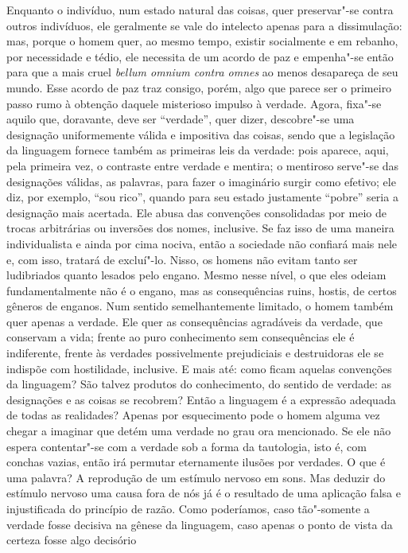 Enquanto o indivíduo, num estado natural das coisas, quer preservar"-se
contra outros indivíduos, ele geralmente se vale do intelecto apenas
para a dissimulação: mas, porque o homem quer, ao mesmo tempo, existir
socialmente e em rebanho, por necessidade e tédio, ele necessita de um
acordo de paz e empenha"-se então para que a mais cruel \textit{bellum
omnium contra omnes} ao menos desapareça de seu mundo. Esse acordo de
paz traz consigo, porém, algo que parece ser o primeiro passo rumo à
obtenção daquele misterioso impulso à verdade. Agora, fixa"-se aquilo
que, doravante, deve ser “verdade”, quer dizer, descobre"-se uma
designação uniformemente válida e impositiva das coisas, sendo que a
legislação da linguagem fornece também as primeiras leis da verdade:
pois aparece, aqui, pela primeira vez, o contraste entre verdade e
mentira; o mentiroso serve"-se das designações válidas, as palavras,
para fazer o imaginário surgir como efetivo; ele diz, por exemplo,
“sou rico”, quando para seu estado justamente “pobre” seria a
designação mais acertada. Ele abusa das convenções consolidadas por
meio de trocas arbitrárias ou inversões dos nomes, inclusive. Se 
faz isso de uma maneira individualista e ainda por cima nociva,
então a sociedade não confiará mais nele e, com isso, tratará de
excluí"-lo. Nisso, os homens não evitam tanto ser ludibriados
quanto lesados pelo engano. Mesmo nesse nível, o que eles odeiam
fundamentalmente não é o engano, mas as consequências ruins, hostis, de
certos gêneros de enganos. Num sentido semelhantemente limitado, o homem
também quer apenas a verdade. Ele quer as consequências agradáveis da
verdade, que conservam a vida; frente ao puro conhecimento sem
consequências ele é indiferente, frente às verdades possivelmente
prejudiciais e destruidoras ele se indispõe com hostilidade, inclusive.
E mais até: como ficam aquelas convenções da linguagem? São talvez
produtos do conhecimento, do sentido de verdade: as designações e as
coisas se recobrem? Então a linguagem é a expressão adequada de todas
as realidades? Apenas por esquecimento pode o homem alguma vez chegar a imaginar que
detém uma verdade no grau ora mencionado. Se ele não espera
contentar"-se com a verdade sob a forma da tautologia, isto é, com
conchas vazias, então irá permutar eternamente ilusões por verdades. O
que é uma palavra? A reprodução de um estímulo nervoso em sons. Mas
deduzir do estímulo nervoso uma causa fora de nós já é o resultado de
uma aplicação falsa e injustificada do princípio de razão. Como
poderíamos, caso tão"-somente a verdade fosse decisiva na gênese da
linguagem, caso apenas o ponto de vista da certeza fosse algo decisório
